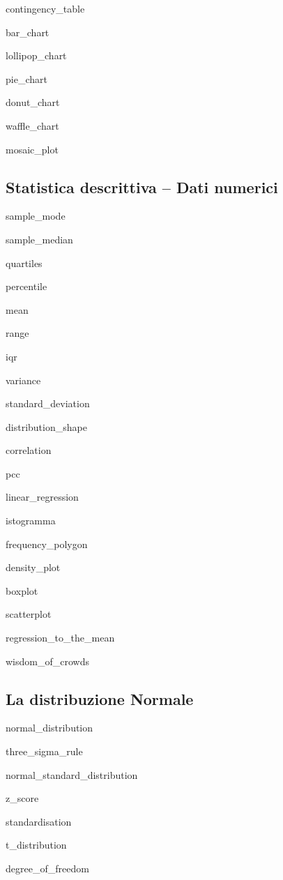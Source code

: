 \documentclass{report}
\begin{document}
\gls{contingency_table}

\gls{bar_chart}

\gls{lollipop_chart}

\gls{pie_chart}

\gls{donut_chart}

\gls{waffle_chart}

\gls{mosaic_plot}




\subsection*{Statistica descrittiva -- Dati numerici}

\gls{sample_mode}

\gls{sample_median}

\gls{quartiles}

\gls{percentile}

\gls{mean}

\gls{range}

\gls{iqr}

\gls{variance}

\gls{standard_deviation}

\gls{distribution_shape}

\gls{correlation}

\gls{pcc}

\gls{linear_regression}

\gls{istogramma}

\gls{frequency_polygon}

\gls{density_plot}

\gls{boxplot}

\gls{scatterplot}

\gls{regression_to_the_mean}

\gls{wisdom_of_crowds}




\subsection*{La distribuzione Normale}

\gls{normal_distribution}

\gls{three_sigma_rule}

\gls{normal_standard_distribution}

\gls{z_score}

\gls{standardisation}

\gls{t_distribution}

\gls{degree_of_freedom}
\end{document}
